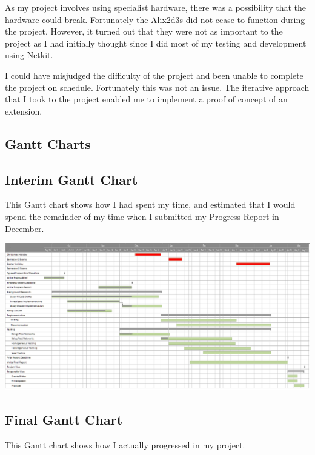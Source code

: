 \documentclass[12pt]{report}
\begin{document}
As my project involves using specialist hardware, there was a possibility that
the hardware could break. Fortunately the Alix2d3s did not cease to function
during the project. However, it turned out that they were not as important to
the project as I had initially thought since I did most of my testing and
development using Netkit.

I could have misjudged the difficulty of the project and been unable to complete
the project on schedule. Fortunately this was not an issue. The iterative
approach that I took to the project enabled me to implement a proof of
concept of an extension.  

\pagebreak
\begin{landscape} 

\section{Gantt Charts}
\subsection{Interim Gantt Chart}
This Gantt chart shows how I had spent my time, and estimated that I would
spend the remainder of my time when I submitted my Progress Report in December. 

\begin{center}
  \hspace*{-0.75cm}
  \includegraphics[width=1.105\linewidth]{../Gantt/EvenBetterDec.png}
\end{center}

\pagebreak

\subsection{Final Gantt Chart}
This Gantt chart shows how I actually progressed in my project.


\end{landscape}
\end{document}

